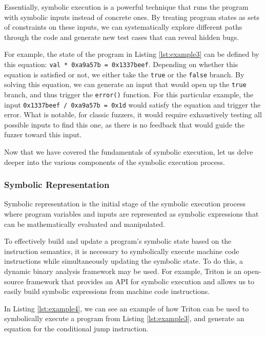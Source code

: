 Essentially, symbolic execution is a powerful technique that runs the program with symbolic inputs instead of concrete ones. By treating program states as sets of constraints on these inputs, we can systematically explore different paths through the code and generate new test cases that can reveal hidden bugs.

For example, the state of the program in Listing \ref{lst:example3} can be defined by this equation: \texttt{val * 0xa9a57b = 0x1337beef}. Depending on whether this equation is satisfied or not, we either take the \texttt{true} or the \texttt{false} branch. By solving this equation, we can generate an input that would open up the \texttt{true} branch, and thus trigger the \texttt{error()} function. For this particular example, the input \texttt{0x1337beef / 0xa9a57b = 0x1d} would satisfy the equation and trigger the error. What is notable, for classic fuzzers, it would require exhaustively testing all possible inputs to find this one, as there is no feedback that would guide the fuzzer toward this input.

Now that we have covered the fundamentals of symbolic execution, let us delve deeper into the various components of the symbolic execution process.

\subsubsection{Symbolic Representation}

Symbolic representation is the initial stage of the symbolic execution process where program variables and inputs are represented as symbolic expressions that can be mathematically evaluated and manipulated.

To effectively build and update a program's symbolic state based on the instruction semantics, it is necessary to symbolically execute machine code instructions while simultaneously updating the symbolic state. To do this, a dynamic binary analysis framework may be used. For example, Triton \cite{triton-sstic2015} is an open-source framework that provides an API for symbolic execution and allows us to easily build symbolic expressions from machine code instructions.

In Listing \ref{lst:example4}, we can see an example of how Triton can be used to symbolically execute a program from Listing \ref{lst:example3}, and generate an equation for the conditional jump instruction.


